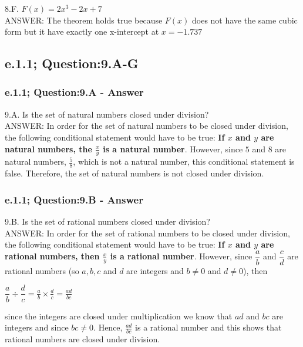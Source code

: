 8.F. $F(x) = 2x^3 - 2x + 7$ \\
	ANSWER: The theorem holds true because $F(x)$ does not have the same cubic form but it have exactly one x-intercept at $x=-1.737$ \\


\subsection{e.1.1; Question:9.A-G}

\subsubsection*{e.1.1; Question:9.A - Answer}
9.A. Is the set of natural numbers closed under division? \\

ANSWER: In order for the set of natural numbers to be closed under division, the following conditional statement would have to be true: {\bf If $x$ and $y$ are natural numbers, the $\frac{x}{y}$ is a natural number}. However, since $5$ and $8$ are natural numbers, $\frac{5}{8}$, which is not a natural number, this conditional statement is false. Therefore, the set of natural numbers is not closed under division. \\


\subsubsection*{e.1.1; Question:9.B - Answer}
9.B. Is the set of rational numbers closed under division? \\

ANSWER: In order for the set of rational numbers to be closed under division, the following conditional statement would have to be true: {\bf If $x$ and $y$ are rational numbers, then $\frac{x}{y}$ is a rational number}. However, since $\dfrac{a}{b}$ and $\dfrac{c}{d}$ are rational numbers (so $a,b,c$ and $d$ are integers and  $b \neq 0$ and $d \neq 0$), then \\

\begin{center}
$\dfrac{a}{b} \div \dfrac{d}{c} = \frac{a}{b} \times \frac{d}{c} = \frac{ad}{bc}$
\end{center}

since the integers are closed under multiplication we know that $ad$ and $bc$ are integers and since $bc \neq 0$. Hence, $\frac{ad}{bc}$ is a rational number and this shows that rational numbers are closed under division. \\


